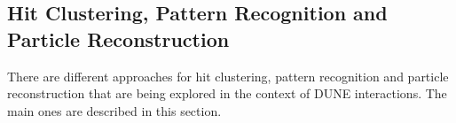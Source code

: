 
\subsection{Hit Clustering, Pattern Recognition and Particle Reconstruction}

There are different approaches for hit clustering, pattern recognition and particle reconstruction that are being explored in the context of DUNE  interactions. The main ones are described in this section.  

